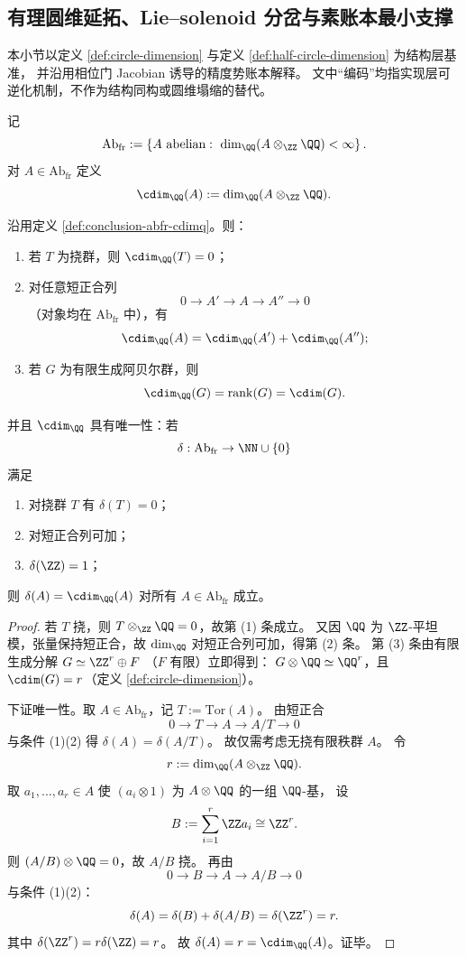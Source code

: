 \subsection{有理圆维延拓、Lie--solenoid 分岔与素账本最小支撑}\label{subsec:conclusion-rational-cdim-solenoid-precision-ledger-rigidity}
本小节以定义 \ref{def:circle-dimension} 与定义 \ref{def:half-circle-dimension} 为结构层基准，
并沿用相位门 Jacobian 诱导的精度势账本解释。
文中“编码”均指实现层可逆化机制，不作为结构同构或圆维塌缩的替代。

\begin{definition}[有限有理秩阿贝尔类与有理圆维]\label{def:conclusion-abfr-cdimq}
记
\[
\mathrm{Ab}_{\mathrm{fr}}
:=
\left\{
A\ \text{abelian}:\ \dim_{\QQ}(A\otimes_{\ZZ}\QQ)<\infty
\right\}.
\]
对 \(A\in\mathrm{Ab}_{\mathrm{fr}}\) 定义
\[
\cdim_{\QQ}(A):=\dim_{\QQ}(A\otimes_{\ZZ}\QQ).
\]
\end{definition}

\begin{proposition}[有理圆维的唯一短正合可加延拓]\label{prop:conclusion-cdimq-unique-exact-extension}
沿用定义 \ref{def:conclusion-abfr-cdimq}。则：
\begin{enumerate}
  \item 若 \(T\) 为挠群，则 \(\cdim_{\QQ}(T)=0\)；
  \item 对任意短正合列
  \[
  0\to A'\to A\to A''\to 0
  \]
  （对象均在 \(\mathrm{Ab}_{\mathrm{fr}}\) 中），有
  \[
  \cdim_{\QQ}(A)=\cdim_{\QQ}(A')+\cdim_{\QQ}(A'');
  \]
  \item 若 \(G\) 为有限生成阿贝尔群，则
  \[
  \cdim_{\QQ}(G)=\operatorname{rank}(G)=\cdim(G).
  \]
\end{enumerate}
并且 \(\cdim_{\QQ}\) 具有唯一性：若
\[
\delta:\mathrm{Ab}_{\mathrm{fr}}\to \NN\cup\{0\}
\]
满足
\begin{enumerate}
  \item 对挠群 \(T\) 有 \(\delta(T)=0\)；
  \item 对短正合列可加；
  \item \(\delta(\ZZ)=1\)；
\end{enumerate}
则 \(\delta(A)=\cdim_{\QQ}(A)\) 对所有 \(A\in\mathrm{Ab}_{\mathrm{fr}}\) 成立。
\end{proposition}
\begin{proof}
若 \(T\) 挠，则 \(T\otimes_{\ZZ}\QQ=0\)，故第 (1) 条成立。
又因 \(\QQ\) 为 \(\ZZ\)-平坦模，张量保持短正合，故
\(\dim_{\QQ}\) 对短正合列可加，得第 (2) 条。
第 (3) 条由有限生成分解
\(
G\simeq \ZZ^r\oplus F
\)
（\(F\) 有限）立即得到：
\(
G\otimes\QQ\simeq \QQ^r
\)，且 \(\cdim(G)=r\)（定义 \ref{def:circle-dimension}）。

下证唯一性。取 \(A\in\mathrm{Ab}_{\mathrm{fr}}\)，记 \(T:=\mathrm{Tor}(A)\)。
由短正合
\[
0\to T\to A\to A/T\to 0
\]
与条件 (1)(2) 得 \(\delta(A)=\delta(A/T)\)。
故仅需考虑无挠有限秩群 \(A\)。
令
\[
r:=\dim_{\QQ}(A\otimes_{\ZZ}\QQ).
\]
取 \(a_1,\dots,a_r\in A\) 使 \((a_i\otimes 1)\) 为 \(A\otimes\QQ\) 的一组 \(\QQ\)-基，
设
\[
B:=\sum_{i=1}^r \ZZ a_i\cong \ZZ^r.
\]
则 \((A/B)\otimes\QQ=0\)，故 \(A/B\) 挠。
再由
\[
0\to B\to A\to A/B\to 0
\]
与条件 (1)(2)：
\[
\delta(A)=\delta(B)+\delta(A/B)=\delta(\ZZ^r)=r.
\]
其中 \(\delta(\ZZ^r)=r\delta(\ZZ)=r\)。
故 \(\delta(A)=r=\cdim_{\QQ}(A)\)。证毕。
\end{proof}

